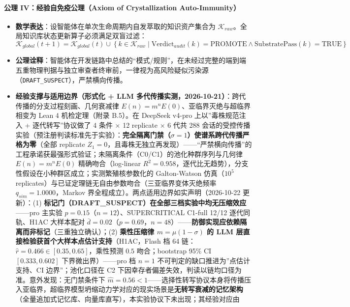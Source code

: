 \paragraph{公理 IV：经验自免疫公理（Axiom of Crystallization
Auto-Immunity）}\label{ux516cux7406-ivux7ecfux9a8cux81eaux514dux75abux516cux7406axiom-of-crystallization-auto-immunity}

\begin{itemize}
\tightlist
\item
  \textbf{数学表达}：设智能体在单次生命周期内自发萃取的知识资产集合为
  \(\mathcal{K}_{raw}\)。全局知识库状态更新算子必须满足双盲过滤：
  \[ \mathcal{K}_{global}(t+1) = \mathcal{K}_{global}(t) \cup \left\{ k \in \mathcal{K}_{raw} \mid \text{Verdict}_{audit}(k) = \text{PROMOTE} \wedge \text{SubstratePass}(k) = \text{TRUE} \right\} \]
\item
  \textbf{公理诠释}：智能体在开发链路中总结的``模式/规则''，在未经过完整的端到端五重物理判据与独立审查者终审前，一律视为高风险疑似污染源（\texttt{DRAFT\_SUSPECT}），严禁横向传播。
\item
  \textbf{经验支撑与适用边界（形式化 + LLM
  多代传播实测，2026-10-21）}：跨代传播的分支过程刻画、几何衰减律
  \(E(n)=m^n E(0)\)、亚临界灭绝与超临界相变为 Lean 4 机检定理（附录
  B.5）。在 DeepSeek v4-pro 上以''毒株规范注入 + 逐代转写''协议做了 4
  条件 × 12 replicate × 6 代共 288
  会话的受控传播实验（预注册判读标准先于实验）：\textbf{完全隔离门禁（\(\sigma=1\)）使谱系跨代传播严格为零}（全部
  replicate
  \(Z_1=0\)，且毒株无独立再发现）------``严禁横向传播''的工程承诺获最强形式验证；未隔离条件（C0/C1）的池化种群序列与几何律
  \(E(n)=m^n E(0)\) 精确吻合（log-linear
  \(R^2=0.958\)，逐代比无趋势），分支性假设在小种群区成立；实测繁殖核参数化的
  Galton-Watson 仿真（\(10^5\)
  replicates）与已证定理链无自由参数吻合（三亚临界变体灭绝频率
  \(q_{sim}=1.0000\)，Markov
  界全程成立）。两点适用边界如实声明（2026-10-22 更新）：(1)
  \textbf{标记门（DRAFT\_SUSPECT）在全部三档实验中均无压缩效应}------pro
  主实验 \(p=0.15\)（\(n=12\)）、SUPERCRITICAL C1-full 12/12
  逐代同轨、H1AC 大样本配对
  \(\bar d=0.02\)（\(p=0.69\)，\(n=48\)）------\textbf{防御实现应依赖隔离而非标记}（三重独立确认）；(2)
  \textbf{乘性压缩律 \(m=\mu(1-\sigma)\) 的 LLM
  层直接检验获首个大样本点估计支持}（H1AC，Flash 档 64
  链：\(\hat r=0.466\in[0.35,0.65]\)，乘性预测 \(0.5\) 吻合；bootstrap
  95\% CI \([0.333,0.602]\) 下界微出界）------pro 档 \(n=1\)
  不可判定的缺口推进为''点估计支持、CI 边界''；池化口径在 C2
  下因幸存者偏差失效，判读以链均口径为准。意外发现：无门禁条件下
  \(\hat m=0.56<1\)------选择性转写协议本身将传播压入亚临界，超临界模型坍缩动力学对应的现实场景是\textbf{无转写衰减的记忆架构}（全量追加式记忆库、向量库直写），本实验协议下未出现；其经验对应由

\end{itemize}
